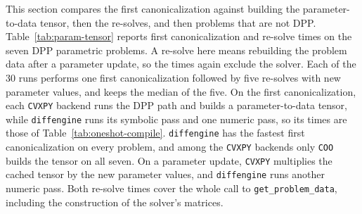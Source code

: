 This section compares the first canonicalization against building the parameter-to-data tensor,
then the re-solves, and then problems that are not \ac{DPP}.
Table~\ref{tab:param-tensor} reports first canonicalization and re-solve times on the
seven \ac{DPP} parametric problems. A re-solve here means rebuilding the problem data after a
parameter update, so the times again exclude the solver. Each of the $30$ runs performs one
first canonicalization followed by five re-solves with new parameter values, and keeps the
median of the five.
On the first canonicalization, each \texttt{CVXPY} backend runs the \ac{DPP} path and builds a
parameter-to-data tensor, while \texttt{diffengine} runs its symbolic pass and one numeric
pass, so its times are those of Table~\ref{tab:oneshot-compile}. \texttt{diffengine} has the
fastest first canonicalization on every problem, and among the \texttt{CVXPY} backends only
\texttt{COO} builds the tensor on all seven. On a parameter update, \texttt{CVXPY}
multiplies the cached tensor by the new parameter values, and \texttt{diffengine} runs another
numeric pass. Both re-solve times cover the whole call to
\texttt{get\_problem\_data}, including the construction of the solver's matrices.


